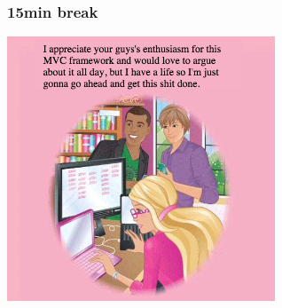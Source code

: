 \begin{frame} 
    \frametitle{15min break}
    \begin{center}
        \includegraphics[width=0.6\textwidth]{images/barbie3.png}
    \end{center}
\end{frame}


